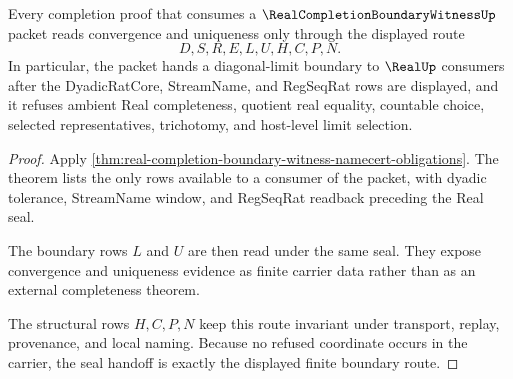 \begin{theorem}
\label{thm:real-completion-boundary-witness-seal-handoff}
Every completion proof that consumes a $\RealCompletionBoundaryWitnessUp$ packet reads convergence and uniqueness only through the displayed route
$$
D,S,R,E,L,U,H,C,P,N.
$$
In particular, the packet hands a diagonal-limit boundary to $\RealUp$ consumers after the DyadicRatCore, StreamName, and RegSeqRat rows are displayed, and it refuses ambient Real completeness, quotient real equality, countable choice, selected representatives, trichotomy, and host-level limit selection.
\end{theorem}
\begin{proof}
Apply \autoref{thm:real-completion-boundary-witness-namecert-obligations}. The theorem lists the only rows available to a consumer of the packet, with dyadic tolerance, StreamName window, and RegSeqRat readback preceding the Real seal.

The boundary rows $L$ and $U$ are then read under the same seal. They expose convergence and uniqueness evidence as finite carrier data rather than as an external completeness theorem.

The structural rows $H,C,P,N$ keep this route invariant under transport, replay, provenance, and local naming. Because no refused coordinate occurs in the carrier, the seal handoff is exactly the displayed finite boundary route.
\end{proof}


\begin{closurestatus}{\RealCompletionBoundaryWitnessUp}
  \theoryclosure{\seedClosure}
  \formalstatus{\unformalizedV}
\end{closurestatus}
